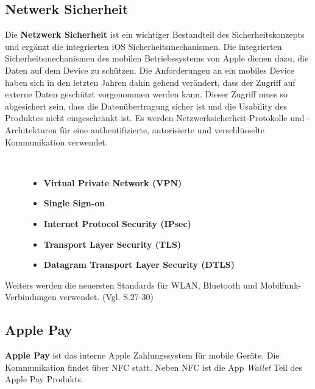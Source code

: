 \subsection{Netwerk Sicherheit}
\label{sec:NetworkSec}
Die \textbf{ Netzwerk Sicherheit} ist ein wichtiger Bestandteil des Sicherheitskonzepts und ergänzt die integrierten iOS Sicherheitsmechanismen. Die integrierten Sicherheitsmechanismen des mobilen Betriebssystems von Apple dienen dazu, die Daten auf dem Device zu schützen. Die Anforderungen an ein mobiles Device haben sich in den letzten Jahren dahin gehend verändert, dass der Zugriff auf externe Daten geschützt vorgenommen werden kann. Dieser Zugriff muss so abgesichert sein, dass die Datenübertragung sicher ist und die Usability des Produktes nicht eingeschränkt ist. Es werden Netzwerksicherheit-Protokolle und -Architekturen für eine authentifizierte, autorisierte und verschlüsselte Kommunikation verwendet.
\begin{description}
\item[\parbox{\textwidth} {Ein iOS Device verfügt über folgende Netzwerksicherheit-Protokolle und -Architekturen
an}]~\par
	\begin{itemize}
		\item \textbf{Virtual Private Network (VPN)}
 		\item \textbf{Single Sign-on}
 		\item \textbf{Internet Protocol Security (IPsec)}
 		\item \textbf{Transport Layer Security (TLS)} %
		\item \textbf{Datagram Transport Layer Security (DTLS)}
        \end{itemize}
\end{description}
Weiters werden die neuersten Standards für WLAN, Bluetooth und Mobilfunk-Verbindungen verwendet. (Vgl. \cite{Apple[4]} S.27-30)

\subsection{Apple Pay}
\label{sec:ApplePay}

\textbf{Apple Pay} ist das interne Apple Zahlungssystem für mobile Geräte. Die Kommunikation findet über NFC statt. Neben NFC ist die App \textit{\glqq Wallet\grqq{}} Teil des Apple Pay Produkts.

